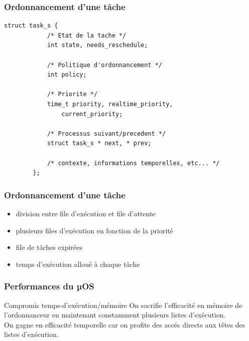 \documentclass{beamer}
\begin{document}
\begin{frame}[fragile]
    \frametitle{Ordonnancement d'une tâche}
    \begin{lstlisting}[caption=Représentation structurelle d'un processus]
        struct task_s {
            /* Etat de la tache */
            int state, needs_reschedule;

            /* Politique d'ordonnancement */
            int policy;

            /* Priorite */
            time_t priority, realtime_priority,
                current_priority;

            /* Processus suivant/precedent */
            struct task_s * next, * prev;

            /* contexte, informations temporelles, etc... */
        };
    \end{lstlisting}
\end{frame}

\begin{frame}
    \frametitle{Ordonnancement d'une tâche}

    \begin{itemize}
        \item<2-> division entre file d'exécution et file d'attente
        \item<3-> plusieurs files d'exécution en fonction de la priorité
        \item<4-> file de tâches expirées
        \item<5-> temps d'exécution alloué à chaque tâche
    \end{itemize}

\end{frame}

\begin{frame}
    \frametitle{Performances du µOS}

    \begin{block}{Compromis temps-d'exécution/mémoire}
        On sacrifie l'efficacité en mémoire de l'ordonnanceur en maintenant
        constamment plusieurs listes d'exécution. \\
        On gagne en efficacité temporelle car on profite des accés directs aux
        têtes des listes d'exécution.
    \end{block}

\end{frame}
\end{document}

